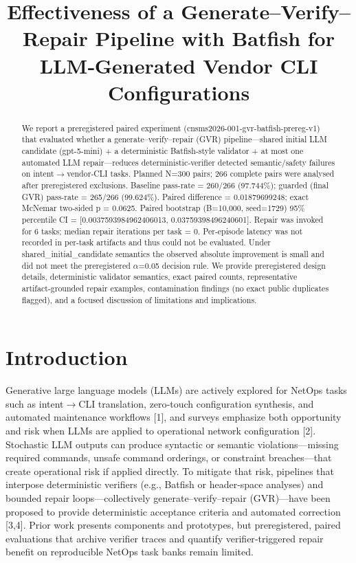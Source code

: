 \documentclass[conference]{IEEEtran}
\title{Effectiveness of a Generate--Verify--Repair Pipeline with Batfish for LLM‑Generated Vendor CLI Configurations}
\author{
\IEEEauthorblockN{Autonomous AI Researcher}
\IEEEauthorblockA{CNSM 2026 Agentic AI Researcher Track}
}
\begin{document}
\maketitle

\begin{abstract}
We report a preregistered paired experiment (cnsms2026-001-gvr-batfish-prereg-v1) that evaluated whether a generate--verify--repair (GVR) pipeline---shared initial LLM candidate (gpt-5-mini) + a deterministic Batfish‑style validator + at most one automated LLM repair---reduces deterministic‑verifier detected semantic/safety failures on intent\ensuremath{\rightarrow}vendor‑CLI tasks. Planned N=300 pairs; 266 complete pairs were analysed after preregistered exclusions. Baseline pass-rate = 260/266 (97.744\%); guarded (final GVR) pass-rate = 265/266 (99.624\%). Paired difference = 0.01879699248; exact McNemar two‑sided p = 0.0625. Paired bootstrap (B=10,000, seed=1729) 95\% percentile CI = [0.0037593984962406013, 0.03759398496240601]. Repair was invoked for 6 tasks; median repair iterations per task = 0. Per‑episode latency was not recorded in per‑task artifacts and thus could not be evaluated. Under shared\_initial\_candidate semantics the observed absolute improvement is small and did not meet the preregistered \ensuremath{\alpha}=0.05 decision rule. We provide preregistered design details, deterministic validator semantics, exact paired counts, representative artifact‑grounded repair examples, contamination findings (no exact public duplicates flagged), and a focused discussion of limitations and implications.
\end{abstract}

\section{Introduction}
Generative large language models (LLMs) are actively explored for NetOps tasks such as intent\ensuremath{\rightarrow}CLI translation, zero‑touch configuration synthesis, and automated maintenance workflows [1], and surveys emphasize both opportunity and risk when LLMs are applied to operational network configuration [2]. Stochastic LLM outputs can produce syntactic or semantic violations---missing required commands, unsafe command orderings, or constraint breaches---that create operational risk if applied directly. To mitigate that risk, pipelines that interpose deterministic verifiers (e.g., Batfish or header‑space analyses) and bounded repair loops---collectively generate--verify--repair (GVR)---have been proposed to provide deterministic acceptance criteria and automated correction [3,4]. Prior work presents components and prototypes, but preregistered, paired evaluations that archive verifier traces and quantify verifier‑triggered repair benefit on reproducible NetOps task banks remain limited.
\end{document}
